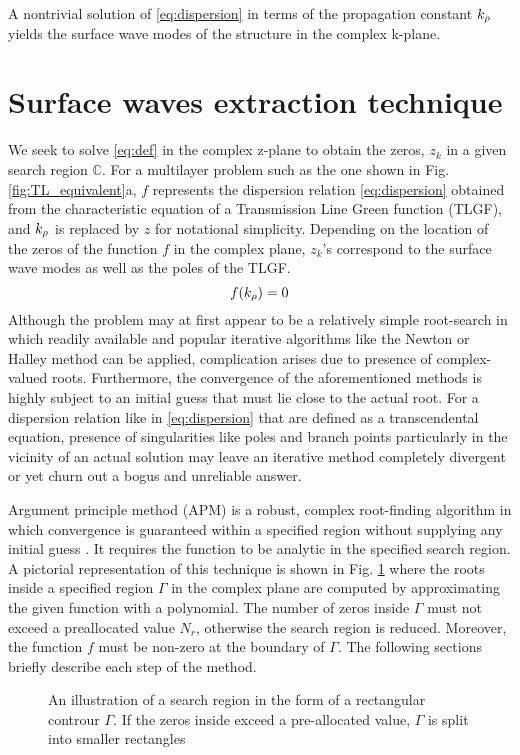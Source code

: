 \documentclass[11pt]{article}
\begin{document}
A nontrivial solution of \eqref{eq:dispersion} in terms of the propagation constant $k_{\rho}$ yields the surface wave modes of the structure in the complex k-plane.
\section{Surface waves extraction technique}
%
We seek to solve \eqref{eq:def} in the complex z-plane to obtain the zeros, $z_k$ in a given search region $\mathbb{C}$. For a multilayer problem such as the one shown in Fig. \ref{fig:TL_equivalent}a, $f$ represents the dispersion relation \eqref{eq:dispersion} obtained from the characteristic equation of a Transmission Line Green function (TLGF), and $k_{\rho}$ is replaced by $z$ for notational simplicity. Depending on the location of the zeros of the function $f$ in the complex plane, $z_k$'s correspond to the surface wave modes as well as the poles of the TLGF.
%
\begin{equation}
  f(k_{\rho}) = 0
  \label{eq:def}
\end{equation}
%
Although the problem may at first appear to be a relatively simple root-search in which readily available and popular iterative algorithms like the Newton or Halley method can be applied, complication arises due to presence of complex-valued roots. Furthermore, the convergence of the aforementioned methods is highly subject to an initial guess that must lie close to the actual root. For a dispersion relation like in \eqref{eq:dispersion} that are defined as a transcendental equation, presence of singularities like poles and branch points particularly in the vicinity of an actual solution may leave an iterative method completely divergent or yet churn out a bogus and unreliable answer.

Argument principle method (APM) is a robust, complex root-finding algorithm in which convergence is guaranteed within a specified region without supplying any initial guess \cite{Delves1967c,Carpentier1982c,Botten1983,Kravanja2000c,Dellnitz2002c,Gillan2006c,Chen2017}. It requires the function to be analytic in the specified search region. A pictorial representation of this technique is shown in Fig. \ref{fig:zplane} where the roots inside a specified region $\Gamma$ in the complex plane are computed by approximating the given function with a polynomial. The number of zeros inside $\Gamma$ must not exceed a preallocated value $N_r$, otherwise the search region is reduced. Moreover, the function $f$ must be non-zero at the boundary of $\Gamma$. The following sections briefly describe each step of the method.
%
\begin{figure}[b!]
  \centering
  \def\svgwidth{.5\linewidth}
  
  \caption{An illustration of a search region in the form of a rectangular controur $\Gamma$. If the zeros inside exceed a pre-allocated value, $\Gamma$ is split into smaller rectangles}
  \label{fig:zplane}
\end{figure}
\end{document}
